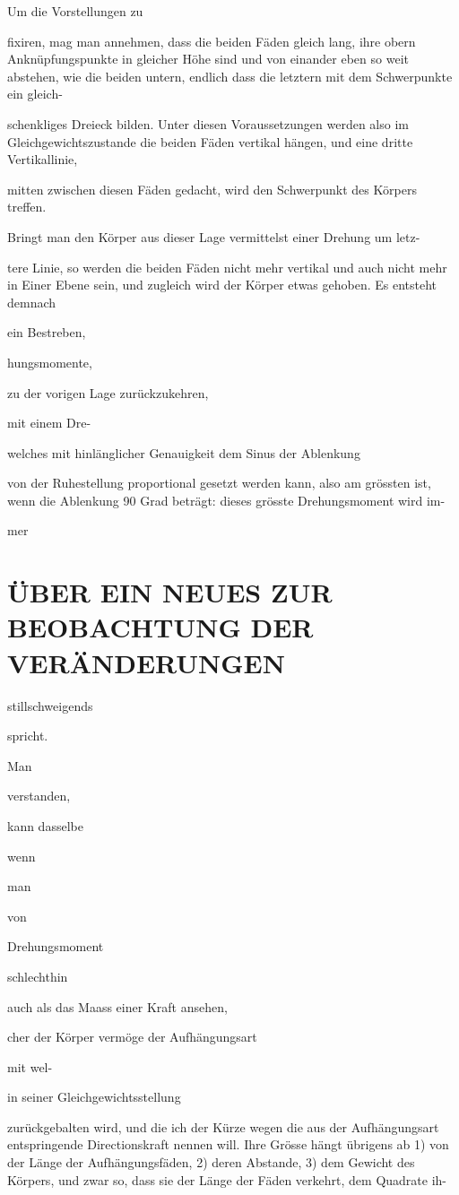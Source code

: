 \documentclass[12pt,a4paper]{article}
\begin{document}
Um die Vorstellungen zu

fixiren, mag man annehmen, dass die beiden Fäden gleich lang, ihre obern Anknüpfungspunkte in gleicher Höhe sind und von einander eben so weit abstehen, wie die beiden untern, endlich dass die letztern mit dem Schwerpunkte ein gleich-

schenkliges Dreieck bilden. Unter diesen Voraussetzungen werden also im Gleichgewichtszustande die beiden Fäden vertikal hängen, und eine dritte Vertikallinie,

mitten zwischen diesen Fäden gedacht, wird den Schwerpunkt des Körpers treffen.

Bringt man den Körper aus dieser Lage vermittelst einer Drehung um letz-

tere Linie, so werden die beiden Fäden nicht mehr vertikal und auch nicht mehr in Einer Ebene sein, und zugleich wird der Körper etwas gehoben. Es entsteht demnach

ein Bestreben,

hungsmomente,

zu der vorigen Lage zurückzukehren,

mit einem Dre-

welches mit hinlänglicher Genauigkeit dem Sinus der Ablenkung

von der Ruhestellung proportional gesetzt werden kann, also am grössten ist, wenn die Ablenkung 90 Grad beträgt: dieses grösste Drehungsmoment wird im-

mer

\section*{ÜBER EIN NEUES ZUR BEOBACHTUNG DER VERÄNDERUNGEN}
stillschweigends

spricht.

Man

verstanden,

kann dasselbe

wenn

man

von

Drehungsmoment

schlechthin

auch als das Maass einer Kraft ansehen,

cher der Körper vermöge der Aufhängungsart

mit wel-

in seiner Gleichgewichtsstellung

zurückgebalten wird, und die ich der Kürze wegen die aus der Aufhängungsart entspringende Directionskraft nennen will. Ihre Grösse hängt übrigens ab 1) von der Länge der Aufhängungsfäden, 2) deren Abstande, 3) dem Gewicht des Körpers, und zwar so, dass sie der Länge der Fäden verkehrt, dem Quadrate ih-
\end{document}
